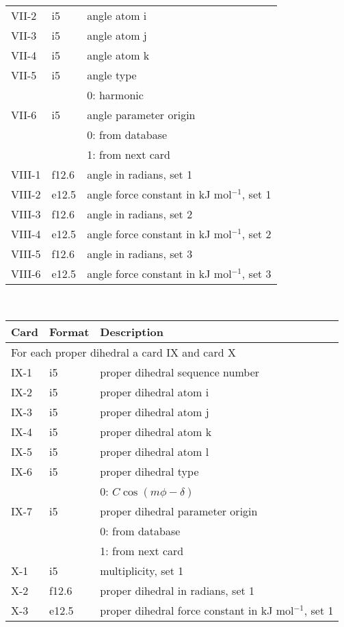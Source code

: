 \begin{center}
\begin{tabular}{lll}
VII-2  & i5     & angle atom i \\
VII-3  & i5     & angle atom j \\
VII-4  & i5     & angle atom k \\
VII-5  & i5     & angle type \\
       &        & 0: harmonic\\
VII-6  & i5     & angle parameter origin\\
       &        & 0: from database \\
       &        & 1: from next card\\
VIII-1 & f12.6  & angle in radians, set 1\\
VIII-2 & e12.5  & angle force constant in kJ mol$^{-1}$, set 1 \\
VIII-3 & f12.6  & angle in radians, set 2\\
VIII-4 & e12.5  & angle force constant in kJ mol$^{-1}$, set 2 \\
VIII-5 & f12.6  & angle in radians, set 3\\
VIII-6 & e12.5  & angle force constant in kJ mol$^{-1}$, set 3 \\
\hline
\end{tabular}\\
\begin{tabular}{lll}
\hline\hline
Card & Format & Description \\ \hline
\multicolumn{3}{l}{For each proper dihedral a card IX and card X} \\
IX-1  & i5     & proper dihedral sequence number \\
IX-2  & i5     & proper dihedral atom i \\
IX-3  & i5     & proper dihedral atom j \\
IX-4  & i5     & proper dihedral atom k \\
IX-5  & i5     & proper dihedral atom l \\
IX-6  & i5     & proper dihedral type \\
      &        & 0: $C\cos(m\phi-\delta)$\\
IX-7  & i5     & proper dihedral parameter origin\\
      &        & 0: from database \\
      &        & 1: from next card\\
X-1 & i5     & multiplicity, set 1\\
X-2 & f12.6  & proper dihedral in radians, set 1\\
X-3 & e12.5  & proper dihedral force constant in kJ mol$^{-1}$, set 1 \\

\end{tabular}
\end{center}
